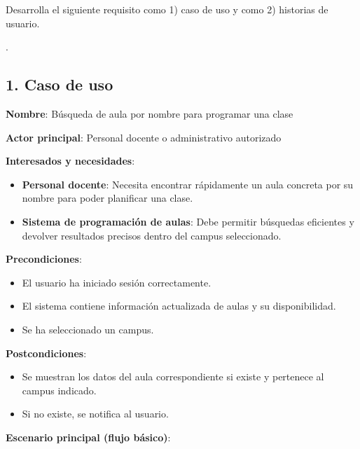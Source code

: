 

\begin{enunciado}
    Desarrolla el siguiente requisito como 1) caso de uso y como 2) historias de usuario.

    .
\end{enunciado}

\subsection{1. Caso de uso}\label{subsec:1.-caso-de-uso}
\begin{solucion}
    \textbf{Nombre}: Búsqueda de aula por nombre para programar una clase

    \textbf{Actor principal}: Personal docente o administrativo autorizado

    \textbf{Interesados y necesidades}:

    \begin{itemize}
        \item \textbf{Personal docente}: Necesita encontrar rápidamente un aula concreta por su nombre para poder planificar una clase.
        \item \textbf{Sistema de programación de aulas}: Debe permitir búsquedas eficientes y devolver resultados precisos dentro del campus seleccionado.
    \end{itemize}
    \textbf{Precondiciones}:

    \begin{itemize}
        \item El usuario ha iniciado sesión correctamente.
        \item El sistema contiene información actualizada de aulas y su disponibilidad.
        \item Se ha seleccionado un campus.
    \end{itemize}
    \textbf{Postcondiciones}:

    \begin{itemize}
        \item Se muestran los datos del aula correspondiente si existe y pertenece al campus indicado.
        \item Si no existe, se notifica al usuario.
    \end{itemize}
    \textbf{Escenario principal (flujo básico)}:


\end{solucion}
